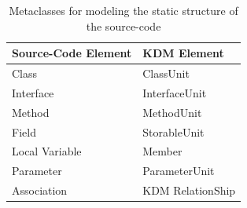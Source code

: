 \begin{table}[!h]
\caption{Metaclasses for modeling the static structure of the source-code}
\label{tab:mappingCodeToKDM}
\centering
\begin{tabular}{|>{\centering}p{3cm}|>{\centering}p{3cm}|}
\hline 
Source-Code Element & KDM Element\tabularnewline
\hline 
\hline 
Class & ClassUnit\tabularnewline
\hline 
Interface & InterfaceUnit\tabularnewline
\hline 
Method & MethodUnit\tabularnewline
\hline 
Field & StorableUnit\tabularnewline
\hline 
Local Variable & Member\tabularnewline
\hline 
Parameter & ParameterUnit\tabularnewline
\hline 
Association & KDM RelationShip\tabularnewline
\hline 
\end{tabular}
\end{table}


 


